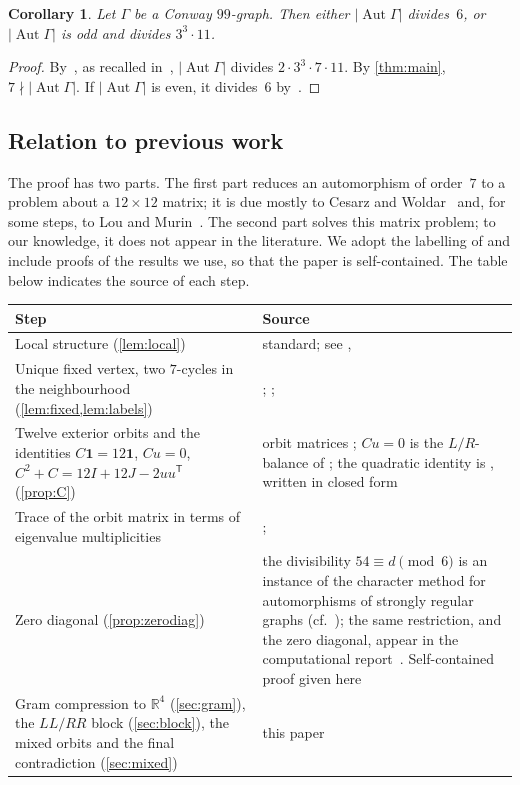\documentclass[11pt,a4paper]{amsart}
\newtheorem{corollary}[theorem]{Corollary}
\theoremstyle{definition}
\theoremstyle{remark}
\newcommand{\R}{\mathbb{R}}
\newcommand{\one}{\mathbf{1}}
\newcommand{\T}{\mathsf{T}}
\DeclareMathOperator{\Aut}{Aut}
\begin{document}
\begin{corollary}\label{cor:group}
Let $\Gamma$ be a Conway $99$-graph. Then either $|\Aut\Gamma|$ divides~$6$, or $|\Aut\Gamma|$ is odd and
divides $3^3\cdot 11$.
\end{corollary}

\begin{proof}
By~\cite[Theorem~2.7]{MM04}, as recalled in~\cite{CW25}, $|\Aut\Gamma|$ divides $2\cdot3^3\cdot7\cdot11$. By
\cref{thm:main}, $7\nmid|\Aut\Gamma|$. If $|\Aut\Gamma|$ is even, it divides~$6$ by~\cite[Corollary~3.13]{CW25}.
\end{proof}

\subsection*{Relation to previous work}
The proof has two parts. The first part reduces an automorphism of order~$7$ to a problem about a $12\times12$
matrix; it is due mostly to Cesarz and Woldar~\cite{CW25} and, for some steps, to Lou and Murin~\cite{LM14}.
The second part solves this matrix problem; to our knowledge, it does not appear in the literature. We adopt the
labelling of \cite[\S2]{CW25} and include proofs of the results we use, so that the paper is self-contained.
The table below indicates the source of each step.
\begin{center}\small
\begin{tabular}{@{}p{}p{}@{}}
\toprule
Step & Source\\
\midrule
Local structure (\cref{lem:local}) & standard; see \cite{W84}, \cite[\S2]{CW25}\\
Unique fixed vertex, two $7$-cycles in the neighbourhood (\cref{lem:fixed,lem:labels}) &
\cite{MM04}; \cite[\S8]{LM14}; \cite[Lemma~2.2, Remark~2.3]{CW25}\\
Twelve exterior orbits and the identities $C\one=12\one$, $Cu=0$, $C^2+C=12I+12J-2uu^{\T}$
(\cref{prop:C}) & orbit matrices \cite{B09,BL11}; $Cu=0$ is the $L/R$-balance of
\cite[Lemma~4.7]{CW25}; the quadratic identity is \cite[Eq.~(5)]{CW25}, written in closed form\\
Trace of the orbit matrix in terms of eigenvalue multiplicities & \cite[\S8]{LM14};
\cite[proof of Theorem~3.11]{CW25}\\
Zero diagonal (\cref{prop:zerodiag}) & the divisibility $54\equiv d\pmod 6$ is an instance of the
character method for automorphisms of strongly regular graphs (cf.~\cite{MM04,BL11}); the same
restriction, and the zero diagonal, appear in the computational report~\cite{Wa26}. Self-contained
proof given here\\
Gram compression to $\R^4$ (\cref{sec:gram}), the $LL/RR$ block (\cref{sec:block}), the mixed orbits
and the final contradiction (\cref{sec:mixed}) & this paper\\
\bottomrule
\end{tabular}
\end{center}
\end{document}
